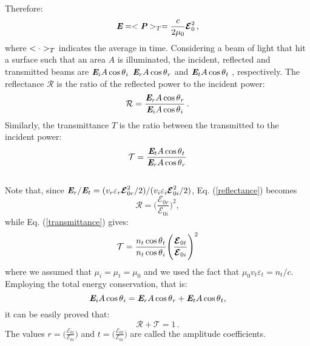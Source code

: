 Therefore:
\begin{equation}
\textit{\textbf{E}} = <\textit{\textbf{P}}>_{T} = \frac{c}{2\mu_0}\boldsymbol{\mathcal{E}}_0^2\,,
\end{equation}
where $<\cdot>_T$ indicates the average in time.
Considering a beam of light that hit a surface such that an area $A$ is illuminated, the incident, reflected and transmitted beams are $\textit{\textbf{E}}_i A\cos\mbox{$\theta$}_i$ $\textit{\textbf{E}}_r A\cos\mbox{$\theta$}_r$ and $\textit{\textbf{E}}_t A\cos\mbox{$\theta$}_t$ , respectively.
The reflectance $\mathcal{R}$ is the ratio of the reflected power to the incident power:
\begin{equation}\label{reflectance}
\mathcal{R} = \frac{\textit{\textbf{E}}_r A\cos\mbox{$\theta$}_r}{\textit{\textbf{E}}_i A\cos\mbox{$\theta$}_i}\,. 
\end{equation}
Similarly, the transmittance $T$ is the ratio between the transmitted to the incident power:
\begin{equation}\label{transmittance}
\mathcal{T} = \frac{\textit{\textbf{E}}_t A\cos\mbox{$\theta$}_t}{\textit{\textbf{E}}_r A\cos\mbox{$\theta$}_r}
\end{equation}\\
Note that, since  $\textit{\textbf{E}} _r/\textit{\textbf{E}}_t = (v_r\varepsilon_r \boldsymbol{\mathcal{E}}_{0r}^2/2)/(v_i\varepsilon_i \boldsymbol{\mathcal{E}}_{0i}^2/2)$, Eq. (\ref{reflectance}) becomes
\begin{equation}\label{R}
\mathcal{R} = \Bigg(\frac{\boldsymbol{\mathcal{E}}_{0 r}}{\boldsymbol{\mathcal{E}}_{0 i}}\Bigg)^2,
\end{equation} 
while Eq. (\ref{transmittance}) gives: \begin{equation}\label{T}
\mathcal{T} = \frac{n_t \cos\mbox{$\theta$}_t}{n_t \cos\mbox{$\theta$}_i}\Bigg(\frac{\boldsymbol{\mathcal{E}}_{0 t}}{\boldsymbol{\mathcal{E}}_{0 i}}\Bigg)^2
\end{equation}
where we assumed that $\mu_i = \mu_t  = \mu_0$ and we used the fact that $\mu_0 v_t\varepsilon_t=n_t/c$.
Employing the total energy conservation, that is:
\begin{equation}
\textit{\textbf{E}}_i A\cos\mbox{$\theta$}_i = \textit{\textbf{E}}_r A\cos\mbox{$\theta$}_r+\textit{\textbf{E}}_t A\cos\mbox{$\theta$}_t,
\end{equation}
it can be easily proved that:
\begin{equation}
\mathcal{R}+\mathcal{T}=1\,.
\end{equation}
The values $r = \Big(\frac{\boldsymbol{\mathcal{E}}_{0 i}}{\boldsymbol{\mathcal{E}}_{0 i}}\Big)$ and 
$t = \Big(\frac{\boldsymbol{\mathcal{E}}_{0 t}}{\boldsymbol{\mathcal{E}}_{0 i}}\Big)$ are called the amplitude coefficients.  

